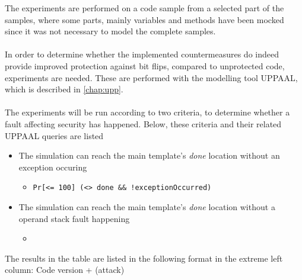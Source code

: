 The experiments are performed on a code sample from a selected part of the \jc samples, where some parts, mainly variables and methods have been mocked since it was not necessary to model the complete samples.\\\\
In order to determine whether the implemented countermeasures do indeed provide improved protection against bit flips, compared to unprotected code, experiments are needed. These are performed with the modelling tool UPPAAL, which is described in \cref{chap:upp}.\\\\
The experiments will be run according to two criteria, to determine whether a fault affecting security has happened. Below, these criteria and their related UPPAAL queries are listed

\begin{itemize}
\item The simulation can reach the main template's \textit{done} location without an exception occuring
	\begin{itemize}
	\item \texttt{Pr[<= 100] (<> done \&\& !exceptionOccurred)}
	\end{itemize}
\item The simulation can reach the main template's \textit{done} location without a operand stack fault happening
	\begin{itemize}
	\item
	\end{itemize}
\end{itemize}

The results in the table are listed in the following format in the extreme left column: Code version + (attack)









